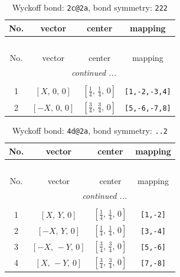 \documentclass[fleqn,8pt]{jsarticle}
\begin{document}
\renewcommand{\arraystretch}{1.2}
\begin{longtable}{cccc}
\caption{Wyckoff bond: {\tt 2c@2a}, bond symmetry: {\tt 222}}
 \\
 \hline \hline
No. & vector & center & mapping \\ \hline \endfirsthead

\multicolumn{3}{l}{\tablename\ \thetable{}} \\
 \hline \hline
No. & vector & center & mapping \\ \hline \endhead

 \hline \hline
\multicolumn{3}{r}{\footnotesize\it continued ...} \\ \endfoot

 \hline \hline
\multicolumn{3}{r}{} \\ \endlastfoot

1 & $\left[ X,\, 0,\, 0 \right]$ & $\left[ \frac{1}{4},\, \frac{1}{4},\, 0 \right]$ & {\tt [1,-2,-3,4]} \\ \hline
2 & $\left[ - X,\, 0,\, 0 \right]$ & $\left[ \frac{3}{4},\, \frac{3}{4},\, 0 \right]$ & {\tt [5,-6,-7,8]} \\
\end{longtable}
\renewcommand{\arraystretch}{1.2}
\begin{longtable}{cccc}
\caption{Wyckoff bond: {\tt 4d@2a}, bond symmetry: {\tt ..2}}
 \\
 \hline \hline
No. & vector & center & mapping \\ \hline \endfirsthead

\multicolumn{3}{l}{\tablename\ \thetable{}} \\
 \hline \hline
No. & vector & center & mapping \\ \hline \endhead

 \hline \hline
\multicolumn{3}{r}{\footnotesize\it continued ...} \\ \endfoot

 \hline \hline
\multicolumn{3}{r}{} \\ \endlastfoot

1 & $\left[ X,\, Y,\, 0 \right]$ & $\left[ \frac{1}{4},\, \frac{1}{4},\, 0 \right]$ & {\tt [1,-2]} \\ \hline
2 & $\left[ - X,\, Y,\, 0 \right]$ & $\left[ \frac{1}{4},\, \frac{1}{4},\, 0 \right]$ & {\tt [3,-4]} \\ \hline
3 & $\left[ - X,\, - Y,\, 0 \right]$ & $\left[ \frac{3}{4},\, \frac{3}{4},\, 0 \right]$ & {\tt [5,-6]} \\ \hline
4 & $\left[ X,\, - Y,\, 0 \right]$ & $\left[ \frac{3}{4},\, \frac{3}{4},\, 0 \right]$ & {\tt [7,-8]} \\
\end{longtable}
\end{document}
